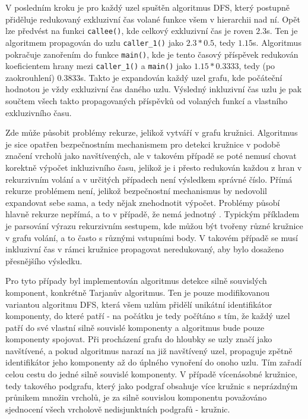 \documentclass[czech,BP]{thesiskiv}
\begin{document}
V posledním kroku je pro každý uzel spuštěn algoritmus DFS, který postupně přiděluje redukovaný exkluzivní čas volané funkce všem v hierarchii nad ní. Opět lze předvést na funkci \texttt{callee()}, kde celkový exkluzivní čas je roven $2.3$s. Ten je algoritmem propagován do uzlu \texttt{caller\_1()} jako $2.3*0.5$, tedy $1.15$s. Algoritmus pokračuje zanořením do funkce \texttt{main()}, kde je tento časový příspěvek redukován koeficientem hrany mezi \texttt{caller\_1()} a \texttt{main()} jako $1.15*0.3333$, tedy (po zaokrouhlení) $0.3833$s. Takto je expandován každý uzel grafu, kde počáteční hodnotou je vždy exkluzivní čas daného uzlu. Výsledný inkluzivní čas uzlu je pak součtem všech takto propagovaných příspěvků od volaných funkcí a vlastního exkluzivního času.

Zde může působit problémy rekurze, jelikož vytváří v grafu kružnici. Algoritmus je sice opatřen bezpečnostním mechanismem pro detekci kružnice v podobě značení vrcholů jako navštívených, ale v takovém případě se poté nemusí chovat korektně výpočet inkluzivního času, jelikož je i přesto redukován každou z hran v rekurzivním volání a v určitých případech není výsledkem správné číslo. Přímá rekurze problémem není, jelikož bezpečnostní mechanismus by nedovolil expandovat sebe sama, a tedy nějak znehodnotit výpočet. Problémy působí hlavně rekurze nepřímá, a to v případě, že nemá jednotný . Typickým příkladem je parsování výrazu rekurzivním sestupem, kde můžou být tvořeny různé kružnice v grafu volání, a to často s různými vstupními body. V takovém případě se musí inkluzivní čas v rámci kružnice propagovat neredukovaný, aby bylo dosaženo přesnějšího výsledku.

Pro tyto případy byl implementován algoritmus detekce silně souvislých komponent, konkrétně Tarjanův algoritmus. Ten je pouze modifikovanou variantou algoritmu DFS, která všem uzlům přidělí unikátní identifikátor komponenty, do které patří - na počátku je tedy počítáno s tím, že každý uzel patří do své vlastní silně souvislé komponenty a algoritmus bude pouze komponenty spojovat. Při procházení grafu do hloubky se uzly značí jako navštívené, a pokud algoritmus narazí na již navštívený uzel, propaguje zpětně identifikátor jeho komponenty až do úplného vynoření do onoho uzlu. Tím zařadí celou cestu do jedné silně souvislé komponenty. V případě vícenásobné kružnice, tedy takového podgrafu, který jako podgraf obsahuje více kružnic s neprázdným průnikem množin vrcholů, je za silně souvislou komponentu považováno sjednocení všech vrcholově nedisjunktních podgrafů - kružnic.
\end{document}
